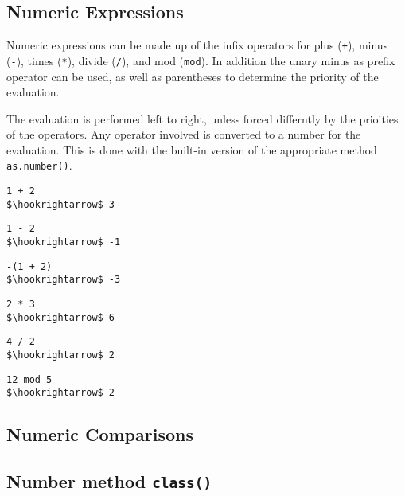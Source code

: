 \documentclass[11pt,a4paper]{scrbook}
\begin{document}
\subsection{Numeric Expressions}

Numeric expressions can be made up of the infix operators for plus (\verb|+|),
minus (\verb|-|), times (\verb|*|), divide (\verb|/|), and mod (\verb|mod|).
In addition the unary minus as prefix operator can be used, as well as
parentheses to determine the priority of the evaluation.

The evaluation is performed left to right, unless forced differntly by the
prioities of the operators. Any operator involved is converted to a number for
the evaluation. This is done with the built-in version of the appropriate
method \verb|as.number()|.


\begin{lstlisting}[language=BibTool,mathescape=true]
1 + 2
$\hookrightarrow$ 3
\end{lstlisting}

\begin{lstlisting}[language=BibTool,mathescape=true]
1 - 2
$\hookrightarrow$ -1
\end{lstlisting}

\begin{lstlisting}[language=BibTool,mathescape=true]
-(1 + 2)
$\hookrightarrow$ -3
\end{lstlisting}

\begin{lstlisting}[language=BibTool,mathescape=true]
2 * 3
$\hookrightarrow$ 6
\end{lstlisting}

\begin{lstlisting}[language=BibTool,mathescape=true]
4 / 2
$\hookrightarrow$ 2
\end{lstlisting}

\begin{lstlisting}[language=BibTool,mathescape=true]
12 mod 5
$\hookrightarrow$ 2
\end{lstlisting}

\subsection{Numeric Comparisons}


\subsection{Number method \texttt{class()}}
\end{document}
